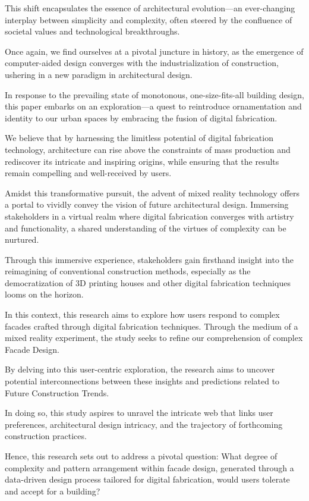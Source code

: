 This shift encapsulates the essence of architectural evolution—an ever-changing interplay between simplicity and complexity, often steered by the confluence of societal values and technological breakthroughs.

Once again, we find ourselves at a pivotal juncture in history, as the emergence of computer-aided design converges with the industrialization of construction, ushering in a new paradigm in architectural design.

In response to the prevailing state of monotonous, one-size-fits-all building design, this paper embarks on an exploration—a quest to reintroduce ornamentation and identity to our urban spaces by embracing the fusion of digital fabrication.

We believe that by harnessing the limitless potential of digital fabrication technology, architecture can rise above the constraints of mass production and rediscover its intricate and inspiring origins, while ensuring that the results remain compelling and well-received by users.

Amidst this transformative pursuit, the advent of mixed reality technology offers a portal to vividly convey the vision of future architectural design.
Immersing stakeholders in a virtual realm where digital fabrication converges with artistry and functionality, a shared understanding of the virtues of complexity can be nurtured.

Through this immersive experience, stakeholders gain firsthand insight into the reimagining of conventional construction methods, especially as the democratization of 3D printing houses and other digital fabrication techniques looms on the horizon.

In this context, this research aims to explore  how users respond to complex facades crafted through  digital fabrication techniques.
Through the medium of a mixed reality experiment, the study seeks to refine our comprehension of complex Facade Design.

By delving into this user-centric exploration,  the research aims to uncover potential interconnections between these insights and predictions related to Future Construction Trends.

In doing so, this study aspires to unravel the intricate web that links user preferences, architectural design intricacy, and the trajectory of forthcoming construction practices.

Hence, this research sets out to address a pivotal question: What degree of complexity and pattern arrangement within facade design, generated through a data-driven design process tailored for digital fabrication, would users tolerate and accept for a building?

